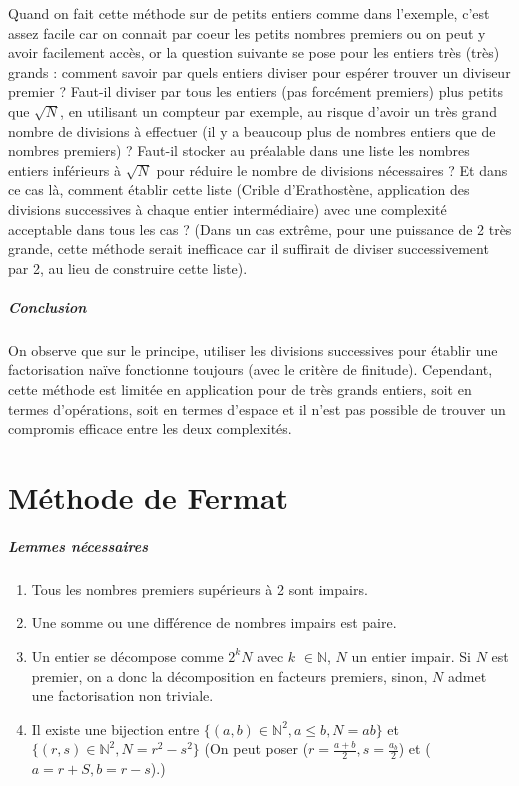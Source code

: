 \documentclass[11pt,a4paper]{article}
\begin{document}
	
	Quand on fait cette méthode sur de petits entiers comme dans l'exemple, c'est assez facile car on connait par coeur les petits nombres premiers ou on peut y avoir facilement accès, or la question suivante se pose pour les entiers très (très) grands : comment savoir par quels entiers diviser pour espérer trouver un diviseur premier ? Faut-il diviser par tous les entiers (pas forcément premiers) plus petits que $\sqrt{N}$, en utilisant un compteur par exemple, au risque d'avoir un très grand nombre de divisions à effectuer (il y a beaucoup plus de nombres entiers que de nombres premiers) ? Faut-il stocker au préalable dans une liste les nombres entiers inférieurs à $\sqrt{N}$ pour réduire le nombre de divisions nécessaires ? Et dans ce cas là, comment établir cette liste (Crible d'Erathostène, application des divisions successives à chaque entier intermédiaire) avec une complexité acceptable dans tous les cas ? (Dans un cas extrême, pour une puissance de 2 très grande, cette méthode serait inefficace car il suffirait de diviser successivement par 2, au lieu de construire cette liste).
	
	\subparagraph{Conclusion}
	
	On observe que sur le principe, utiliser les divisions successives pour établir une factorisation naïve fonctionne toujours (avec le critère de finitude). Cependant, cette méthode est limitée en application pour de très grands entiers, soit en termes d'opérations, soit en termes d'espace et il n'est pas possible de trouver un compromis efficace entre les deux complexités.
	
	
	\newpage
	
	\section{\LARGE{Méthode de Fermat}}
	
	\subparagraph{Lemmes nécessaires}
	\begin{enumerate}
		\item Tous les nombres premiers supérieurs à 2 sont impairs.
		
		\item Une somme ou une différence de nombres impairs est paire.
		
		\item Un entier se décompose comme $2^{k}N$ avec $\mathit{k}$ $\in\mathbb{N}$, $\mathit{N}$ un entier impair. Si $\mathit{N}$ est premier, on a donc la décomposition en facteurs premiers, sinon, $\mathit{N}$ admet une factorisation non triviale.
		
		\item Il existe une bijection entre ${\{(a,b) \in \mathbb{N}^2, a \leq b, N = ab\}}$ et $\{(r,s) \in \mathbb{N}^2, N = r^2 - s^2\}$ 
		(On peut poser ($r = \frac{a+b}{2}, s = \frac{a_b}{2}$) et ($a=r+S , b = r-s$).)
	\end{enumerate}
	
\end{document}
